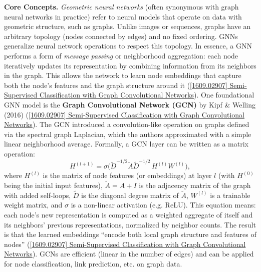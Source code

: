 \documentclass[12pt,a4paper]{report}
\begin{document}
\textbf{Core Concepts.} \textit{Geometric neural networks} (often synonymous with graph neural networks in practice) refer to neural models that operate on data with geometric structure, such as graphs. Unlike images or sequences, graphs have an arbitrary topology (nodes connected by edges) and no fixed ordering. GNNs generalize neural network operations to respect this topology. In essence, a GNN performs a form of \textit{message passing} or neighborhood aggregation: each node iteratively updates its representation by combining information from its neighbors in the graph. This allows the network to learn node embeddings that capture both the node’s features and the graph structure around it (\href{https://arxiv.org/abs/1609.02907#:~:text=structured%20data%20that%20is%20based,methods%20by%20a%20significant%20margin}{[1609.02907] Semi-Supervised Classification with Graph Convolutional Networks}). One foundational GNN model is the \textbf{Graph Convolutional Network (GCN)} by Kipf \& Welling (2016) (\href{https://arxiv.org/abs/1609.02907#:~:text=,methods%20by%20a%20significant%20margin}{[1609.02907] Semi-Supervised Classification with Graph Convolutional Networks}). The GCN introduced a convolution-like operation on graphs defined via the spectral graph Laplacian, which the authors approximated with a simple linear neighborhood average. Formally, a GCN layer can be written as a matrix operation:
\[
H^{(l+1)} = \sigma\!\Big(\tilde{D}^{-1/2}\tilde{A}\tilde{D}^{-1/2} \, H^{(l)} W^{(l)}\Big),
\]
where \( H^{(l)} \) is the matrix of node features (or embeddings) at layer \( l \) (with \( H^{(0)} \) being the initial input features), \( \tilde{A} = A + I \) is the adjacency matrix of the graph with added self-loops, \( \tilde{D} \) is the diagonal degree matrix of \( \tilde{A} \), \( W^{(l)} \) is a trainable weight matrix, and \( \sigma \) is a non-linear activation (e.g. ReLU). This equation means: each node’s new representation is computed as a weighted aggregate of itself and its neighbors’ previous representations, normalized by neighbor counts. The result is that the learned embeddings “encode both local graph structure and features of nodes” (\href{https://arxiv.org/abs/1609.02907#:~:text=convolutional%20architecture%20via%20a%20localized,methods%20by%20a%20significant%20margin}{[1609.02907] Semi-Supervised Classification with Graph Convolutional Networks}). GCNs are efficient (linear in the number of edges) and can be applied for node classification, link prediction, etc. on graph data.
\end{document}
